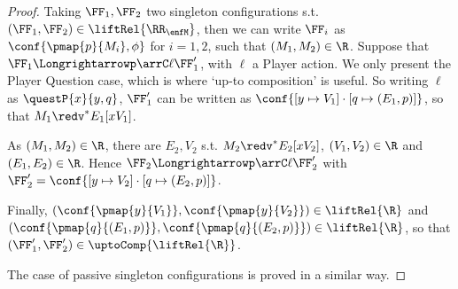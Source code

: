 \begin{proof}
 Taking $\FF_1,\FF_2$ two singleton configurations s.t. 
 $(\FF_1,\FF_2) \in \liftRel{\RR_{\enfM}}$,
 then we can write $\FF_i$ as $\conf{\pmap{p}{M_i},\phi}$
 for $i=1,2$, such that $(M_1,M_2) \in \R$.
 Suppose that $\FF_1 \Longrightarrowp\arrC\ell 
 \FF'_1 $,
 with $\ell$ a Player action. We only present the Player Question case,
which is where  `up-to composition' is useful.
So writing $\ell$ as $\questP{x}{y,q}$,
$\FF'_1 $ can be written as $\conf{[y \mapsto V_1]\cdot[q \mapsto (E_1,p)]}$,
so that $M_1 \redv^{*} E_1[x V_1]$.
 
As $(M_1,M_2) \in \R$, there are $E_2,V_2$ s.t.
 $M_2 \redv^{*} E_2[x V_2]$, $(V_1,V_2) \in \R$ and $(E_1,E_2) \in \R$.
Hence $\FF_2    
\Longrightarrowp\arrC\ell
 \FF'_2$ with $\FF'_2 = 
 \conf{[y \mapsto V_2]\cdot[q \mapsto (E_2,p)]}$.
 
Finally, $(\conf{\pmap{y}{V_1}},\conf{\pmap{y}{V_2}}) \in \liftRel{\R}$ 
 and $(\conf{\pmap{q}{(E_1,p)}},\conf{\pmap{q}{(E_2,p)}}) \in \liftRel{\R}$,
 so that 
 ${(\FF'_1,\FF'_2)} \in {\uptoComp{\liftRel{\R}}}$.
 
 The case of passive singleton configurations is proved in a similar way.
 \end{proof}
